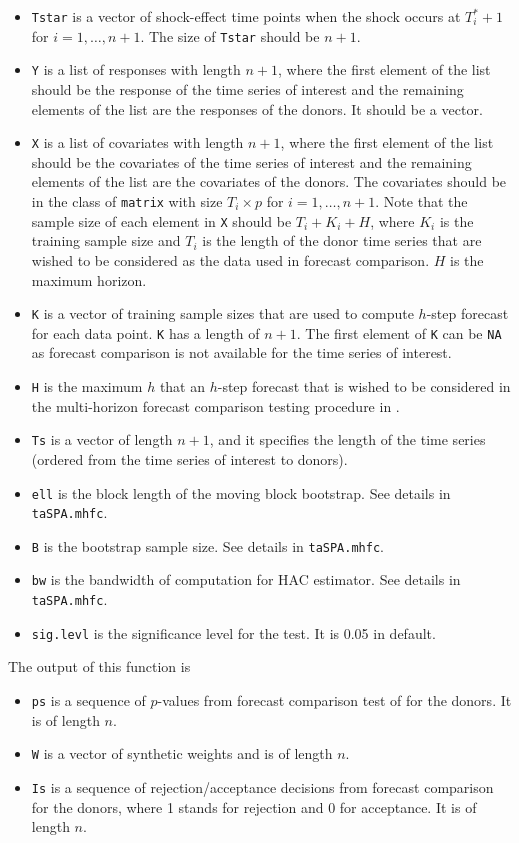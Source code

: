 \documentclass[12pt]{article}
\begin{document}
\begin{itemize}
	\item \texttt{Tstar} is a vector of shock-effect time points when the shock occurs at $T^*_i+1$ for $i = 1, \ldots, n+1$. The size of \texttt{Tstar} should be $n+1$.
	\item \texttt{Y} is a list of responses with length $n +1$,  where the first element of the list should be the response of the time series of interest and the remaining elements of the list are the responses of the donors. It should be a vector.
	\item \texttt{X} is a list of covariates with length $n+1$, where the first element of the list should be the covariates of the time series of interest and the remaining elements of the list are the covariates of the donors. The covariates should be in the class of \texttt{matrix} with size $T_i\times p$ for $i = 1, \ldots, n+1$. Note that the sample size of each element  in \texttt{X} should be  $T_i+ K_i + H$, where $K_i$ is the training sample size and $T_i$ is the length of the donor time series that are wished to be considered as the data used in forecast comparison. $H$ is the maximum horizon.
	\item \texttt{K} is a vector of training sample sizes that are used to compute $h$-step forecast for each data point. \texttt{K} has a length of $n+1$. The first element of \texttt{K} can be \texttt{NA} as forecast comparison is not available for the time series of interest.
	\item \texttt{H} is the maximum $h$ that an $h$-step forecast that is wished to be considered in the multi-horizon forecast comparison testing procedure in .
	\item \texttt{Ts} is a vector of length $n+1$, and it specifies the length of the time series (ordered from the time series of interest to donors).
	\item \texttt{ell} is the block length of the moving block bootstrap. See details in \texttt{taSPA.mhfc}.
	\item \texttt{B} is the bootstrap sample size. See details in \texttt{taSPA.mhfc}.
	\item \texttt{bw} is the bandwidth of computation for HAC estimator. See details in \texttt{taSPA.mhfc}.
	\item \texttt{sig.levl} is the significance level for the test. It is 0.05 in default.
\end{itemize}
 
 The output of this function is
 \begin{itemize}
 	\item \texttt{ps} is a sequence of $p$-values from forecast comparison test of   for the donors. It is of length $n$.
 	\item \texttt{W} is a vector of synthetic weights and is of length $n$.
 	\item  \texttt{Is} is a sequence of rejection/acceptance decisions from forecast comparison for the donors, where 1 stands for rejection and 0 for acceptance. It is of length $n$.
 \end{itemize}
 
\end{document}
